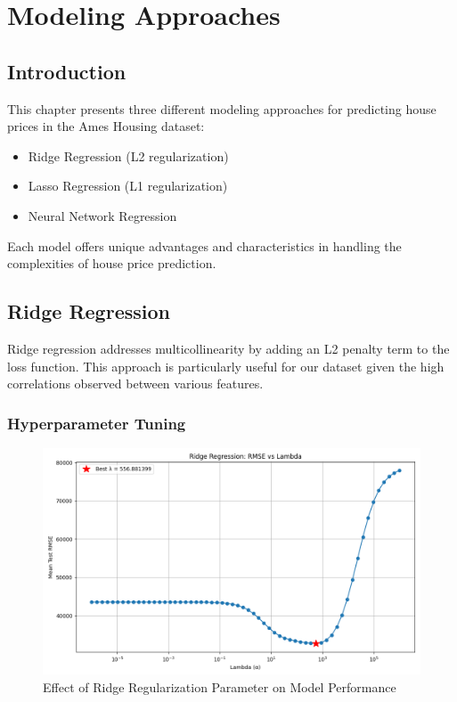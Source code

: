 \chapter{Modeling Approaches}

\section{Introduction}
This chapter presents three different modeling approaches for predicting house prices in the Ames Housing dataset:
\begin{itemize}
    \item Ridge Regression (L2 regularization)
    \item Lasso Regression (L1 regularization)
    \item Neural Network Regression
\end{itemize}

Each model offers unique advantages and characteristics in handling the complexities of house price prediction.

\section{Ridge Regression}
Ridge regression addresses multicollinearity by adding an L2 penalty term to the loss function. This approach is particularly useful for our dataset given the high correlations observed between various features.

\subsection{Hyperparameter Tuning}
\begin{figure}[H]
    \centering
    \includegraphics[width=1.0\textwidth]{../ridge_lambda_vs_rmse.png}
    \caption{Effect of Ridge Regularization Parameter on Model Performance}
    \label{fig:ridge_lambda}
\end{figure}

